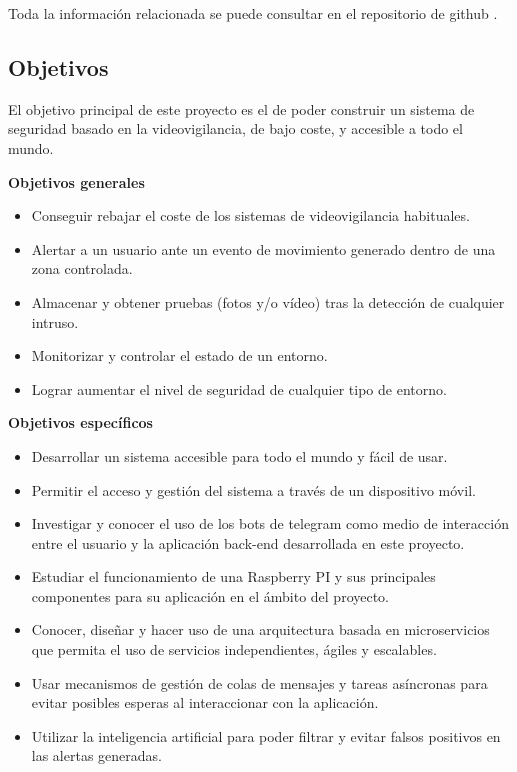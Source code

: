 Toda la información relacionada se puede consultar en el repositorio de github \cite{ref1}.

\subsection{Objetivos}

El objetivo principal de este proyecto es el de poder construir un sistema de seguridad basado en la videovigilancia, de bajo coste, y accesible a todo el mundo.

\textbf{Objetivos generales}

\vspace{-0.3cm}

\begin{itemize}
	\item Conseguir rebajar el coste de los sistemas de videovigilancia habituales.
	\item Alertar a un usuario ante un evento de movimiento generado dentro de una zona controlada.
	\item Almacenar y obtener pruebas (fotos y/o vídeo) tras la detección de cualquier intruso.
	\item Monitorizar y controlar el estado de un entorno.
	\item Lograr aumentar el nivel de seguridad de cualquier tipo de entorno.	
\end{itemize}

\textbf{Objetivos específicos}

\vspace{-0.3cm}

\begin{itemize}
	\item Desarrollar un sistema accesible para todo el mundo y fácil de usar.
	\item Permitir el acceso y gestión del sistema a través de un dispositivo móvil.
	\item Investigar y conocer el uso de los bots de telegram como medio de interacción entre el usuario y la aplicación back-end desarrollada en este proyecto.
	\item Estudiar el funcionamiento de una Raspberry PI y sus principales componentes para su aplicación en el ámbito del proyecto.
	\item Conocer, diseñar y hacer uso de una arquitectura basada en microservicios que permita el uso de servicios independientes, ágiles y escalables.
	\item Usar mecanismos de gestión de colas de mensajes y tareas asíncronas para evitar posibles esperas al interaccionar con la aplicación.
	\item Utilizar la inteligencia artificial para poder filtrar y evitar falsos positivos en las alertas generadas.

\end{itemize}

